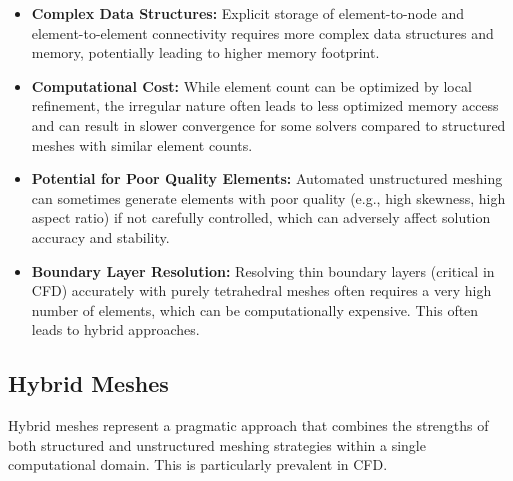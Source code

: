 \documentclass{book}
\begin{document}
\begin{itemize}[leftmargin=*,label=\textbullet]
\begin{itemize}[leftmargin=*,label=$\circ$]
        \item \textbf{Complex Data Structures:} Explicit storage of element-to-node and element-to-element connectivity requires more complex data structures and memory, potentially leading to higher memory footprint.
        \item \textbf{Computational Cost:} While element count can be optimized by local refinement, the irregular nature often leads to less optimized memory access and can result in slower convergence for some solvers compared to structured meshes with similar element counts.
        \item \textbf{Potential for Poor Quality Elements:} Automated unstructured meshing can sometimes generate elements with poor quality (e.g., high skewness, high aspect ratio) if not carefully controlled, which can adversely affect solution accuracy and stability.
        \item \textbf{Boundary Layer Resolution:} Resolving thin boundary layers (critical in CFD) accurately with purely tetrahedral meshes often requires a very high number of elements, which can be computationally expensive. This often leads to hybrid approaches.
    \end{itemize}




\subsection{Hybrid Meshes}
Hybrid meshes represent a pragmatic approach that combines the strengths of both structured and unstructured meshing strategies within a single computational domain. This is particularly prevalent in CFD.


\end{itemize}
\end{document}
